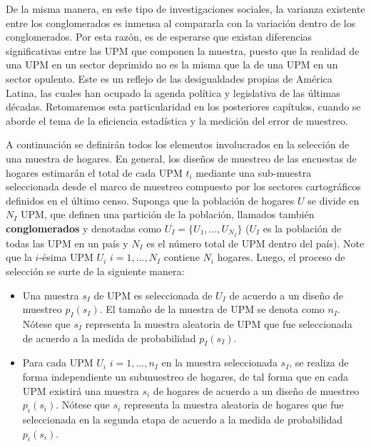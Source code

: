 \documentclass[
  10pt,
  spanish,
]{book}
\providecommand{\tightlist}{%
  \setlength{\itemsep}{0pt}\setlength{\parskip}{0pt}}
\begin{document}
De la misma manera, en este tipo de investigaciones sociales, la varianza existente entre los conglomerados es inmensa al compararla con la variación dentro de los conglomerados. Por esta razón, es de esperarse que existan diferencias significativas entre las UPM que componen la muestra, puesto que la realidad de una UPM en un sector deprimido no es la misma que la de una UPM en un sector opulento. Este es un reflejo de las desigualdades propias de América Latina, las cuales han ocupado la agenda política y legislativa de las últimas décadas. Retomaremos esta particularidad en los posteriores capítulos, cuando se aborde el tema de la eficiencia estadística y la medición del error de muestreo.

A continuación se definirán todos los elementos involucrados en la selección de una muestra de hogares. En general, los diseños de muestreo de las encuestas de hogares estimarán el total de cada UPM \(t_i\) mediante una sub-muestra seleccionada desde el marco de muestreo compuesto por los sectores cartográficos definidos en el último censo. Suponga que la población de hogares \(U\) se divide en \(N_I\) UPM, que definen una partición de la población, llamados también \textbf{conglomerados} y denotadas como \(U_I=\{U_1,\ldots,U_{N_I}\}\) (\(U_I\) es la población de todas las UPM en un país y \(N_I\) es el número total de UPM dentro del país). Note que la \(i\)-ésima UPM \(U_i\) \(i=1,\dots,N_I\) contiene \(N_i\) hogares. Luego, el proceso de selección se surte de la siguiente manera:

\begin{itemize}
\tightlist
\item
  Una muestra \(s_I\) de UPM es seleccionada de \(U_I\) de acuerdo a un diseño de muestreo \(p_I(s_I)\). El tamaño de la muestra de UPM se denota como \(n_I\). Nótese que \(s_I\) representa la muestra aleatoria de UPM que fue seleccionada de acuerdo a la medida de probabilidad \(p_I(s_I)\).
\item
  Para cada UPM \(U_i\) \(i=1,\dots,n_I\) en la muestra seleccionada \(s_I\), se realiza de forma independiente un submuestreo de hogares, de tal forma que en cada UPM existirá una muestra \(s_i\) de hogares de acuerdo a un diseño de muestreo \(p_i(s_i)\). Nótese que \(s_i\) representa la muestra aleatoria de hogares que fue seleccionada en la segunda etapa de acuerdo a la medida de probabilidad \(p_i(s_i)\).
\end{itemize}
\end{document}
